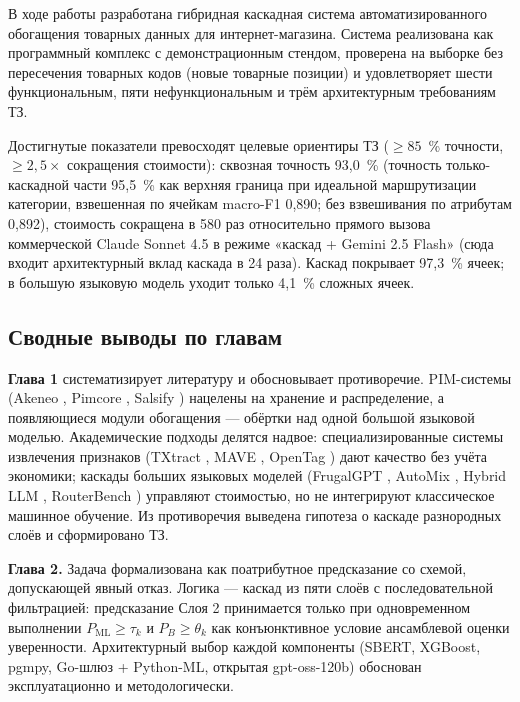 \conclusion

В ходе работы разработана гибридная каскадная система автоматизированного обогащения товарных данных для интернет-магазина. Система реализована как программный комплекс с демонстрационным стендом, проверена на выборке без пересечения товарных кодов (новые товарные позиции) и удовлетворяет шести функциональным, пяти нефункциональным и трём архитектурным требованиям ТЗ.

Достигнутые показатели превосходят целевые ориентиры ТЗ ($\geq 85$~\% точности, $\geq 2{,}5\times$ сокращения стоимости): сквозная точность 93,0~\% (точность только-каскадной части 95,5~\% как верхняя граница при идеальной маршрутизации категории, взвешенная по ячейкам macro-F1 0,890; без взвешивания по атрибутам 0,892), стоимость сокращена в 580 раз относительно прямого вызова коммерческой Claude Sonnet 4.5 в режиме «каскад + Gemini 2.5 Flash» (сюда входит архитектурный вклад каскада в 24 раза). Каскад покрывает 97,3~\% ячеек; в большую языковую модель уходит только 4,1~\% сложных ячеек.

\subsection*{Сводные выводы по главам}

\textbf{Глава 1} систематизирует литературу и обосновывает противоречие. PIM-системы (Akeneo \cite{ref_5}, Pimcore \cite{ref_6}, Salsify \cite{ref_7}) нацелены на хранение и распределение, а появляющиеся модули обогащения — обёртки над одной большой языковой моделью. Академические подходы делятся надвое: специализированные системы извлечения признаков (TXtract \cite{ref_23}, MAVE \cite{ref_24}, OpenTag \cite{ref_25}) дают качество без учёта экономики; каскады больших языковых моделей (FrugalGPT \cite{ref_9}, AutoMix \cite{ref_10}, Hybrid LLM \cite{ref_11}, RouterBench \cite{ref_12}) управляют стоимостью, но не интегрируют классическое машинное обучение. Из противоречия выведена гипотеза о каскаде разнородных слоёв и сформировано ТЗ.

\textbf{Глава 2.} Задача формализована как поатрибутное предсказание со схемой, допускающей явный отказ. Логика — каскад из пяти слоёв с последовательной фильтрацией: предсказание Слоя 2 принимается только при одновременном выполнении $P_{\text{ML}} \geq \tau_k$ и $P_B \geq \theta_k$ как конъюнктивное условие ансамблевой оценки уверенности. Архитектурный выбор каждой компоненты (SBERT, XGBoost, pgmpy, Go-шлюз + Python-ML, открытая gpt-oss-120b) обоснован эксплуатационно и методологически.


